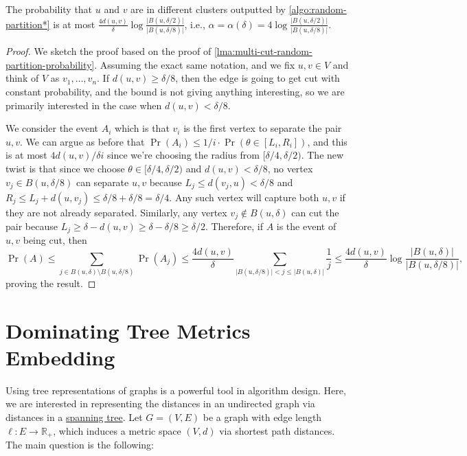 \begin{theorem}\label{thm:random-partition*}
	The probability that \(u\) and \(v\) are in different clusters outputted by \autoref{algo:random-partition*} is at most \(\frac{4 d(u, v)}{\delta } \log \frac{\lvert B(u, \delta / 2) \rvert }{\lvert B(u, \delta / 8) \rvert }\), i.e., \(\alpha = \alpha (\delta ) = 4 \log \frac{\lvert B(u, \delta / 2) \rvert }{\lvert B(u, \delta / 8) \rvert }\).
\end{theorem}
\begin{proof}
	We sketch the proof based on the proof of \autoref{lma:multi-cut-random-partition-probability}. Assuming the exact same notation, and we fix \(u, v \in V\) and think of \(V\) as \(v_1, \dots , v_n\). If \(d(u, v) \geq \delta / 8\), then the edge is going to get cut with constant probability, and the bound is not giving anything interesting, so we are primarily interested in the case when \(d(u, v) < \delta / 8\).

	We consider the event \(A_i\) which is that \(v_i\) is the first vertex to separate the pair \(u, v\). We can argue as before that \(\Pr(A_i) \leq 1 / i \cdot \Pr(\theta \in [L_i, R_i])\), and this is at most \(4d(u, v) / \delta i\) since we're choosing the radius from \([\delta / 4, \delta / 2)\). The new twist is that since we choose \(\theta \in [\delta / 4, \delta / 2)\) and \(d(u, v) <\delta / 8\), no vertex \(v_j \in B(u, \delta / 8)\) can separate \(u, v\) because \(L_j \leq d(v_j, u) < \delta / 8\) and \(R_j \leq L_j + d(u, v_j) \leq \delta / 8 + \delta / 8 = \delta / 4\). Any such vertex will capture both \(u, v\) if they are not already separated. Similarly, any vertex \(v_j \notin B(u, \delta )\) can cut the pair because \(L_j \geq \delta - d(u, v) \geq \delta - \delta / 8 \geq \delta / 2\). Therefore, if \(A\) is the event of \(u, v\) being cut, then
	\[
		\Pr(A)
		\leq \sum_{j \in B(u, \delta ) \setminus B(u, \delta / 8)} \Pr(A_j)
		\leq \frac{4d(u, v)}{\delta } \sum_{\lvert B(u, \delta / 8) \rvert < j \leq \lvert B(u, \delta ) \rvert } \frac{1}{j}
		\leq \frac{4 d(u, v)}{\delta } \log \frac{\lvert B(u, \delta ) \rvert }{\lvert B(u, \delta / 8) \rvert },
	\]
	proving the result.
\end{proof}

\section{Dominating Tree Metrics Embedding}
Using tree representations of graphs is a powerful tool in algorithm design. Here, we are interested in representing the distances in an undirected graph via distances in a \hyperref[def:spanning-tree]{spanning tree}. Let \(G = (V, E)\) be a graph with edge length \(\ell \colon E \to \mathbb{R} _+\), which induces a metric space \((V, d)\) via shortest path distances. The main question is the following:

